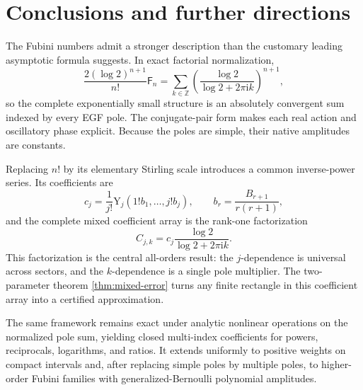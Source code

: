\documentclass[11pt,a4paper,oneside]{article}
\theoremstyle{definition}
\theoremstyle{remark}
\newcommand{\Fub}{\mathsf{F}}
\newcommand{\ii}{\mathrm{i}}
\newcommand{\BellY}{\mathrm{Y}}
\begin{document}
\section{Conclusions and further directions}\label{sec:conclusion}
The Fubini numbers admit a stronger description than the customary leading
asymptotic formula suggests.  In exact factorial normalization,
\[
 \frac{2(\log2)^{n+1}}{n!}\Fub_n
 =\sum_{k\in\mathbb Z}
  \left(\frac{\log2}{\log2+2\pi\ii k}\right)^{n+1},
\]
so the complete exponentially small structure is an absolutely convergent
sum indexed by every EGF pole.  The conjugate-pair form makes each real action
and oscillatory phase explicit.  Because the poles are simple, their native
amplitudes are constants.

Replacing $n!$ by its elementary Stirling scale introduces a common
inverse-power series.  Its coefficients are
\[
 c_j=\frac1{j!}\BellY_j(1!b_1,\ldots,j!b_j),
 \qquad
 b_r=\frac{B_{r+1}}{r(r+1)},
\]
and the complete mixed coefficient array is the rank-one factorization
\[
 C_{j,k}=c_j\frac{\log2}{\log2+2\pi\ii k}.
\]
This factorization is the central all-orders result: the $j$-dependence is
universal across sectors, and the $k$-dependence is a single pole multiplier.
The two-parameter theorem \cref{thm:mixed-error} turns any finite rectangle in
this coefficient array into a certified approximation.

The same framework remains exact under analytic nonlinear operations on the
normalized pole sum, yielding closed multi-index coefficients for powers,
reciprocals, logarithms, and ratios.  It extends uniformly to positive weights
on compact intervals and, after replacing simple poles by multiple poles, to
higher-order Fubini families with generalized-Bernoulli polynomial
amplitudes.
\end{document}
